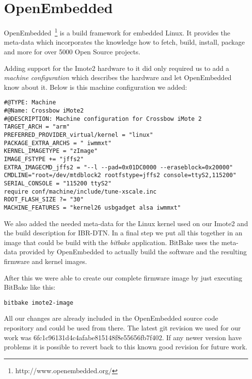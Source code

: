 \chapter{OpenEmbedded}
\label{annexoe}

OpenEmbedded~\footnote{http://www.openembedded.org/} is a build framework for
embedded Linux. It provides the meta-data which incorporates the knowledge how
to fetch, build, install, package and more for over 5000 Open Source projects.

Adding support for the Imote2 hardware to it did only required us to add a
\emph{machine configuration} which describes the hardware and let OpenEmbedded
know about it. Below is this machine configuration we added:

\begin{verbatim}
#@TYPE: Machine
#@Name: Crossbow iMote2
#@DESCRIPTION: Machine configuration for Crossbow iMote 2
TARGET_ARCH = "arm"
PREFERRED_PROVIDER_virtual/kernel = "linux"
PACKAGE_EXTRA_ARCHS = " iwmmxt"
KERNEL_IMAGETYPE = "zImage"
IMAGE_FSTYPE += "jffs2"
EXTRA_IMAGECMD_jffs2 = "--l --pad=0x01DC0000 --eraseblock=0x20000"
CMDLINE="root=/dev/mtdblock2 rootfstype=jffs2 console=ttyS2,115200"
SERIAL_CONSOLE = "115200 ttyS2"
require conf/machine/include/tune-xscale.inc
ROOT_FLASH_SIZE ?= "30"
MACHINE_FEATURES = "kernel26 usbgadget alsa iwmmxt"
\end{verbatim}

We also added the needed meta-data for the Linux kernel used on our Imote2 and
the build description for IBR-DTN. In a final step we put all this together in
an image that could be build with the \emph{bitbake} application. BitBake uses
the meta-data provided by OpenEmbedded to actually build the software and the
resulting firmware and kernel images.

After this we were able to create our complete firmware image by just executing
BitBake like this:

\begin{verbatim}
bitbake imote2-image
\end{verbatim}

All our changes are already included in the OpenEmbedded source code repository
and could be used from there. The latest git revision we used for our work was
6fc1c96131d4c4afabe815148f8e55656fb7f402. If any newer version have problems it
is possible to revert back to this known good revision for future work.
